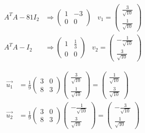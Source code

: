 \begin{align}
    A^T A - 81 I_2 &\Rightarrow \begin{pmatrix}
        1 & -3 \\ 0 & 0
    \end{pmatrix} \;\;\; v_1 = \begin{pmatrix}
        \frac{3}{\sqrt{10}} \\ \frac{1}{\sqrt{10}}
    \end{pmatrix} \\
    A^T A - I_2 &\Rightarrow \begin{pmatrix}
        1 & \frac{1}{3} \\ 0 & 0
    \end{pmatrix} \;\;\; v_2 = \begin{pmatrix}
        -\frac{1}{\sqrt{10}} \\ \frac{3}{\sqrt{10}}
    \end{pmatrix}
\end{align}

\begin{align}
    \Vec{u_1} &= \frac{1}{9} \begin{pmatrix}
        3 & 0 \\ 8 & 3
    \end{pmatrix} \begin{pmatrix}
        \frac{3}{\sqrt{10}} \\ \frac{1}{\sqrt{10}}
    \end{pmatrix} = \begin{pmatrix}
        \frac{1}{\sqrt{10}} \\ \frac{3}{\sqrt{10}}
    \end{pmatrix} \\
    \Vec{u_2} &= \frac{1}{9} \begin{pmatrix}
        3 & 0 \\ 8 & 3
    \end{pmatrix} \begin{pmatrix}
        -\frac{1}{\sqrt{10}} \\ \frac{3}{\sqrt{10}}
    \end{pmatrix} = \begin{pmatrix}
        -\frac{3}{\sqrt{10}} \\ \frac{1}{\sqrt{10}}
    \end{pmatrix}
\end{align}


